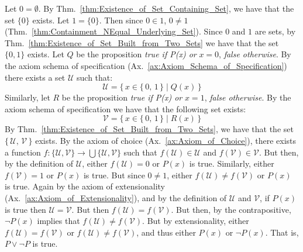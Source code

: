         \begin{bproof}
            Let $0=\emptyset$. By
            Thm.~\ref{thm:Existence_of_Set_Containing_Set}, we have that the set
            $\{0\}$ exists. Let $1=\{0\}$. Then since $0\in{1}$, $0\ne{1}$
            (Thm.~\ref{thm:Containment_NEqual_Underlying_Set}). Since $0$ and
            $1$ are sets, by Thm.~\ref{thm:Existence_of_Set_Built_from_Two_Sets}
            we have that the set $\{0,1\}$ exists. Let $Q$ be the proposition
            \textit{true if P(x) or } $x=0$, \textit{false otherwise}. By the
            axiom schema of specification
            (Ax.~\ref{ax:Axiom_Schema_of_Specification}) there exists a set
            $\mathcal{U}$ such that:
            \begin{equation}
                \mathcal{U}=\big\{\,x\in\{\,0,\,1\,\}\;|\;Q(x)\,\big\}
            \end{equation}
            Similarly, let $R$ be the proposition \textit{true if P(x) or}
            $x=1$, \textit{false otherwise}. By the axiom schema of
            specification we have that the following set exists:
            \begin{equation}
                \mathcal{V}=\big\{\,x\in\{\,0,\,1\,\}\;|\;R(x)\,\big\}
            \end{equation}
            By Thm.~\ref{thm:Existence_of_Set_Built_from_Two_Sets}, we have that
            the set $\{\,\mathcal{U},\,\mathcal{V}\,\}$ exists. By the axiom of
            choice (Ax.~\ref{ax:Axiom_of_Choice}), there exists a function
            $f:\{\mathcal{U},\mathcal{V}\}\rightarrow%
             \bigcup\{\mathcal{U},\mathcal{V}\}$ such that
            $f(\mathcal{U})\in\mathcal{U}$ and $f(\mathcal{V})\in\mathcal{V}$.
            But then, by the definition of $\mathcal{U}$, either
            $f(\mathcal{U})=0$ or $P(x)$ is true. Similarly, either
            $f(\mathcal{V})=1$ or $P(x)$ is true. But since $0\ne{1}$, either
            $f(\mathcal{U})\ne{f}(\mathcal{V})$ or $P(x)$ is true. Again by the
            axiom of extensionality (Ax.~\ref{ax:Axiom_of_Extensionality}), and
            by the definition of $\mathcal{U}$ and $\mathcal{V}$, if $P(x)$ is
            true then $\mathcal{U}=\mathcal{V}$. But then
            $f(\mathcal{U})=f(\mathcal{V})$. But then, by the contrapositive,
            $\neg{P}(x)$ implies that $f(\mathcal{U})\ne{f}(\mathcal{V})$. But
            by extensionality, either $f(\mathcal{U})=f(\mathcal{V})$ or
            $f(\mathcal{U})\ne{f}(\mathcal{V})$, and thus either $P(x)$ or
            $\neg{P}(x)$. That is, $P\lor\neg{P}$ is true.
        \end{bproof}

